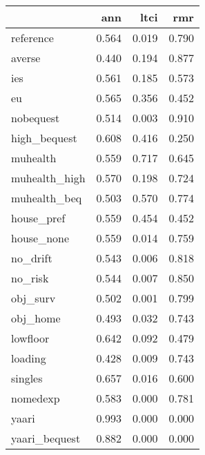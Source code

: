 \begin{tabular}{lrrr}
\toprule
{} &    ann &   ltci &    rmr \\
\midrule
reference     &  0.564 &  0.019 &  0.790 \\
averse        &  0.440 &  0.194 &  0.877 \\
ies           &  0.561 &  0.185 &  0.573 \\
eu            &  0.565 &  0.356 &  0.452 \\
nobequest     &  0.514 &  0.003 &  0.910 \\
high\_bequest  &  0.608 &  0.416 &  0.250 \\
muhealth      &  0.559 &  0.717 &  0.645 \\
muhealth\_high &  0.570 &  0.198 &  0.724 \\
muhealth\_beq  &  0.503 &  0.570 &  0.774 \\
house\_pref    &  0.559 &  0.454 &  0.452 \\
house\_none    &  0.559 &  0.014 &  0.759 \\
no\_drift      &  0.543 &  0.006 &  0.818 \\
no\_risk       &  0.544 &  0.007 &  0.850 \\
obj\_surv      &  0.502 &  0.001 &  0.799 \\
obj\_home      &  0.493 &  0.032 &  0.743 \\
lowfloor      &  0.642 &  0.092 &  0.479 \\
loading       &  0.428 &  0.009 &  0.743 \\
singles       &  0.657 &  0.016 &  0.600 \\
nomedexp      &  0.583 &  0.000 &  0.781 \\
yaari         &  0.993 &  0.000 &  0.000 \\
yaari\_bequest &  0.882 &  0.000 &  0.000 \\
\bottomrule
\end{tabular}
